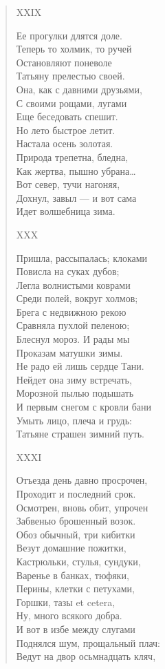 \begin{verse}
XXIX

Ее прогулки длятся доле.\\
Теперь то холмик, то ручей\\
Остановляют поневоле\\
Татьяну прелестью своей.\\
Она, как с давними друзьями,\\
С своими рощами, лугами\\
Еще беседовать спешит.\\
Но лето быстрое летит.\\
Настала осень золотая.\\
Природа трепетна, бледна,\\
Как жертва, пышно убрана…\\
Вот север, тучи нагоняя,\\
Дохнул, завыл — и вот сама\\
Идет волшебница зима.

XXX

Пришла, рассыпалась; клоками\\
Повисла на суках дубов;\\
Легла волнистыми коврами\\
Среди полей, вокруг холмов;\\
Брега с недвижною рекою\\
Сравняла пухлой пеленою;\\
Блеснул мороз. И рады мы\\
Проказам матушки зимы.\\
Не радо ей лишь сердце Тани.\\
Нейдет она зиму встречать,\\
Морозной пылью подышать\\
И первым снегом с кровли бани\\
Умыть лицо, плеча и грудь:\\
Татьяне страшен зимний путь.

XXXI

Отъезда день давно просрочен,\\
Проходит и последний срок.\\
Осмотрен, вновь обит, упрочен\\
Забвенью брошенный возок.\\
Обоз обычный, три кибитки\\
Везут домашние пожитки,\\
Кастрюльки, стулья, сундуки,\\
Варенье в банках, тюфяки,\\
Перины, клетки с петухами,\\
Горшки, тазы et cetera,\\
Ну, много всякого добра.\\
И вот в избе между слугами\\
Поднялся шум, прощальный плач:\\
Ведут на двор осьмнадцать кляч,


\end{verse}
